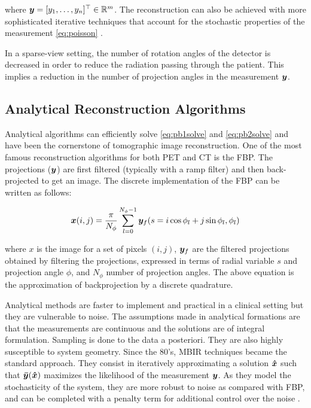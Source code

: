 where $\bm{y}  =  [y_1,\dots,y_n]^\top\in \mathbb{R}^m$. The reconstruction can also be achieved with more sophisticated iterative techniques that account for the stochastic properties of the measurement \eqref{eq:poisson} \cite{nuyts1998iterative,Elbakri2002}.

In a sparse-view setting, the number of rotation angles of the detector is decreased in order to reduce the radiation passing through the patient. This implies a reduction in the number of projection angles in the measurement $\bm{y}$.


\subsection{Analytical Reconstruction Algorithms}
Analytical algorithms can efficiently solve \eqref{eq:pb1solve} and \eqref{eq:pb2solve} and have been the cornerstone of tomographic image reconstruction. One of the most famous reconstruction algorithms for both \ac{PET} and \ac{CT} is the \ac{FBP}. The projections ($\bm{y}$) are first filtered (typically with a ramp filter) and then back-projected to get an image. The discrete implementation of the \ac{FBP} can be written as follows:

\begin{equation}\label{eq:FBP}
	\bm{x}(i,j) = \frac{\pi}{N_\phi}\sum_{l=0}^{N_\phi-1}\bm{y}_f(s=i\cos\phi_l+j\sin\phi_l,\phi_l)
\end{equation}

where $x$ is the image for a set of pixels $(i,j)$, $\bm{y}_f$ are the filtered projections obtained by filtering the projections, expressed in terms of radial variable $s$ and projection angle $\phi$, and $N_\phi$ number of projection angles. The above equation is the approximation of backprojection by a discrete quadrature. 

Analytical methods are faster to implement and practical in a clinical setting but they are vulnerable to noise. The assumptions made in analytical formations are that the measurements are continuous and the solutions are of integral formulation. Sampling is done to the data a posteriori. They are also highly susceptible to system geometry. Since the 80's, \ac{MBIR} techniques \cite{Shepp1982,fessler2000statistical} became the standard approach. They consist in iteratively approximating a solution $\bm{\hat{x}}$ such that $\bm{\bar{y}}(\bm{\hat{x}})$ maximizes the likelihood of the measurement $\bm{y}$. As they model the stochasticity of the system, they are more robust to noise as compared with \ac{FBP}, and can be completed with a penalty term for additional control over the noise \cite{depierro1995}. 
